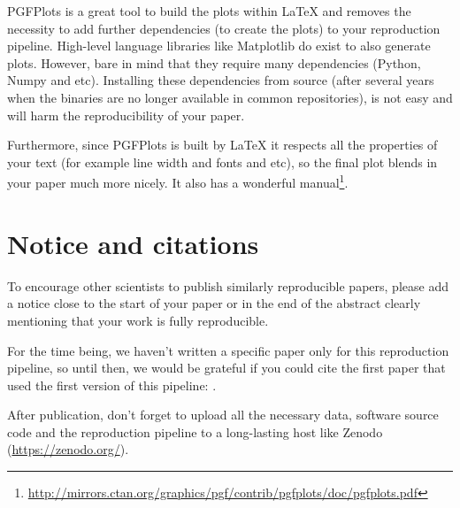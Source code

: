 \documentclass{article}
\begin{document}
\begin{multicols}{2}
PGFPlots is a great tool to build the plots within \LaTeX{} and removes the
necessity to add further dependencies (to create the plots) to your
reproduction pipeline. High-level language libraries like Matplotlib do
exist to also generate plots. However, bare in mind that they require many
dependencies (Python, Numpy and etc). Installing these dependencies from
source (after several years when the binaries are no longer available in
common repositories), is not easy and will harm the reproducibility of your
paper.

\begin{Figure}

\end{Figure}

Furthermore, since PGFPlots is built by \LaTeX{} it respects all the
properties of your text (for example line width and fonts and etc), so the
final plot blends in your paper much more nicely. It also has a wonderful
manual\footnote{\url{http://mirrors.ctan.org/graphics/pgf/contrib/pgfplots/doc/pgfplots.pdf}}.


\section{Notice and citations}
To encourage other scientists to publish similarly reproducible papers,
please add a notice close to the start of your paper or in the end of the
abstract clearly mentioning that your work is fully reproducible.

For the time being, we haven't written a specific paper only for this
reproduction pipeline, so until then, we would be grateful if you could
cite the first paper that used the first version of this pipeline:
\citet{ai15}.

After publication, don't forget to upload all the necessary data, software
source code and the reproduction pipeline to a long-lasting host like
Zenodo (\url{https://zenodo.org/}).



\printbibliography
\end{multicols}
\end{document}
